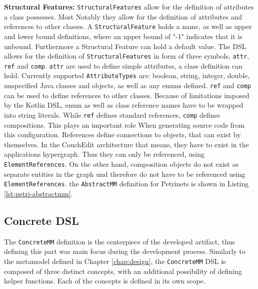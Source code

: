 
% 


% 

\textbf{Structural Features:} \texttt{StructuralFeatures} allow for the definition of attributes a class possesses. Most Notably they allow for the definition of attributes and references to other classes. A \texttt{StructuralFeature} holds a name, as well as upper and lower bound definitions, where an upper bound of "-1" indicates that it is unbound. Furthermore a Structural Feature can hold a default value. The DSL allows for the definition of \texttt{StructuralFeatures} in form of three symbols, \texttt{attr}, \texttt{ref} and \texttt{comp}. \texttt{attr} are used to define simple attributes, a class definition can hold. Currently supported \texttt{AttributeTypes} are: boolean, string, integer, double, unspecified Java classes and objects, as well as any enums defined. \texttt{ref} and \texttt{comp} can be used to define references to other classes. Because of limitations imposed by the Kotlin DSL, enum as well as class reference names have to be wrapped into string literals. While \texttt{ref} defines standard references, \texttt{comp} defines compositions. This plays an important role When generating source code from this configuration. References define connections to objects, that can exist by themselves. In the CouchEdit architecture that means, they have to exist in the applications hypergraph. Thus they can only be referenced, using \texttt{ElementReferences}. On the other hand, composition objects do not exist as separate entities in the graph und therefore do not have to be referenced using \texttt{ElementReferences}. the \texttt{AbstractMM} definition for Petrinets is shown in Listing \ref{lst:petri-abstractmm}.

\subsection{Concrete DSL}
The \texttt{ConcreteMM} definition is the centerpiece of the developed artifact, thus defining this part was main focus during the development process. Similarly to the metamodel defined in Chapter \ref{chap:design}, the \texttt{ConcreteMM} DSL is composed of three distinct concepts, with an additional possibility of defining helper functions. Each of the concepts is defined in its own scope.



